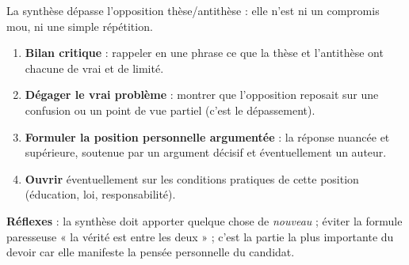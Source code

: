 \documentclass[11pt]{article}
\newcommand{\cle}[1]{{\popxbold\color{popdark}#1}}
\begin{document}
\begin{methode}
La \cle{synthèse} dépasse l'opposition thèse/antithèse : elle n'est ni un compromis mou, ni une simple répétition.
\begin{enumerate}
\item \textbf{Bilan critique} : rappeler en une phrase ce que la thèse et l'antithèse ont chacune de vrai et de limité.
\item \textbf{Dégager le vrai problème} : montrer que l'opposition reposait sur une confusion ou un point de vue partiel (c'est le \cle{dépassement}).
\item \textbf{Formuler la position personnelle argumentée} : la réponse nuancée et supérieure, soutenue par un argument décisif et éventuellement un auteur.
\item \textbf{Ouvrir} éventuellement sur les conditions pratiques de cette position (éducation, loi, responsabilité).
\end{enumerate}
\textbf{Réflexes} : la synthèse doit apporter quelque chose de \emph{nouveau} ; éviter la formule paresseuse « la vérité est entre les deux » ; c'est la partie la plus importante du devoir car elle manifeste la pensée personnelle du candidat.
\end{methode}
\end{document}
